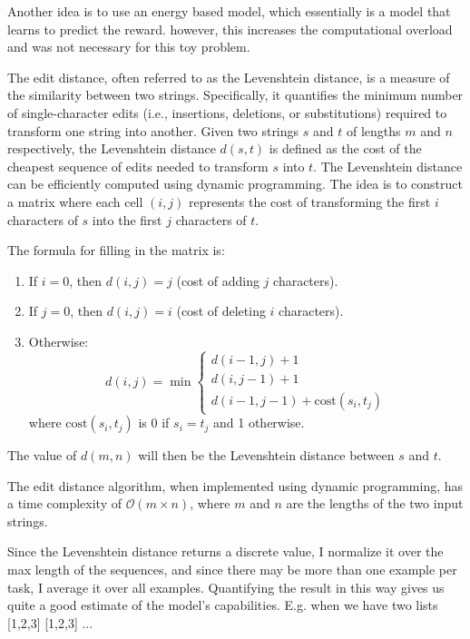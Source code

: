 Another idea is to use an energy based model, which essentially is a model that learns to predict the reward. however, this increases the computational overload and was not necessary for this toy problem.

The edit distance, often referred to as the Levenshtein distance, is a measure of the similarity between two strings. Specifically, it quantifies the minimum number of single-character edits (i.e., insertions, deletions, or substitutions) required to transform one string into another.
Given two strings \( s \) and \( t \) of lengths \( m \) and \( n \) respectively, the Levenshtein distance \( d(s, t) \) is defined as the cost of the cheapest sequence of edits needed to transform \( s \) into \( t \). 
The Levenshtein distance can be efficiently computed using dynamic programming. The idea is to construct a matrix where each cell \( (i, j) \) represents the cost of transforming the first \( i \) characters of \( s \) into the first \( j \) characters of \( t \). 

The formula for filling in the matrix is:
\begin{enumerate}
    \item If \( i = 0 \), then \( d(i, j) = j \) (cost of adding \( j \) characters).
    \item If \( j = 0 \), then \( d(i, j) = i \) (cost of deleting \( i \) characters).
    \item Otherwise:   \[
        d(i, j) = \min \begin{cases} 
        d(i-1, j) + 1 \\ 
        d(i, j-1) + 1 \\ 
        d(i-1, j-1) + \text{cost}(s_i, t_j) 
        \end{cases}
        \]
        where \( \text{cost}(s_i, t_j) \) is 0 if \( s_i = t_j \) and 1 otherwise.
\end{enumerate}

The value of \( d(m, n) \) will then be the Levenshtein distance between \( s \) and \( t \).

The edit distance algorithm, when implemented using dynamic programming, has a time complexity of 
$\mathcal{O}(m \times n)$, where $m$ and  $n$ are the lengths of the two input strings.

Since the Levenshtein distance returns a discrete value, I normalize it over the max length of the sequences, and since there may be more than one example per task, I average it over all examples.
Quantifying the result in this way gives us quite a good estimate of the model's capabilities. E.g. when we have two lists [1,2,3] [1,2,3] ...



















